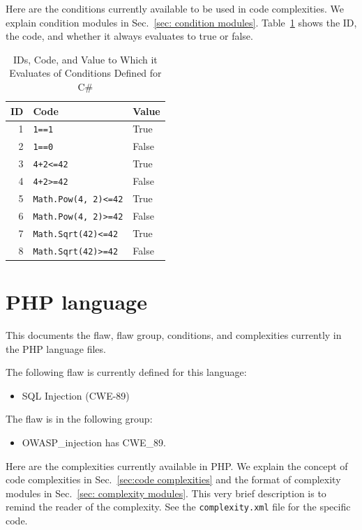 \documentclass[12pt]{article}
\newcommand{\CSharp}{C{\fontseries{b}\selectfont\#}}
\begin{document}
Here are the conditions currently available to be used in code complexities.
We explain condition modules in Sec.~\ref{sec: condition modules}.
Table~\ref{tab:condition IDs for CSharp} shows the ID, the code, and whether it
always evaluates to true or false.

\begin{table}[H]
\centering
\begin{tabular}{|r|l|l|}
\hline
\textbf{ID} & \textbf{Code} & \textbf{Value} \\
\hline
1 & \verb|1==1| & True \\
\hline
2 & \verb|1==0| & False \\
\hline
3 & \verb|4+2<=42| & True \\
\hline
4 & \verb|4+2>=42| & False \\
\hline
5 & \verb|Math.Pow(4, 2)<=42| & True \\
\hline
6 & \verb|Math.Pow(4, 2)>=42| & False \\
\hline
7 & \verb|Math.Sqrt(42)<=42| & True \\
\hline
8 & \verb|Math.Sqrt(42)>=42| & False \\
\hline
\end{tabular}
\caption{IDs, Code, and Value to Which it Evaluates of Conditions Defined for
  \CSharp}
\label{tab:condition IDs for CSharp}
\end{table}


\section{PHP language}
\label{sec:PHP language}

This documents the flaw, flaw group, conditions, and complexities currently in the
PHP language files.

The following flaw is currently defined for this language:
\begin{itemize}
    \item SQL Injection (CWE-89)
\end{itemize}

The flaw is in the following group:
\begin{itemize}
    \item OWASP\_injection has CWE\_89.
\end{itemize}

Here are the complexities currently available in PHP.
We explain the concept of code complexities in Sec.~\ref{sec:code complexities} and
the format of complexity modules in Sec.~\ref{sec: complexity modules}.
This very brief description is to remind the reader of the complexity.
See the \verb|complexity.xml| file for the specific code.
\end{document}
